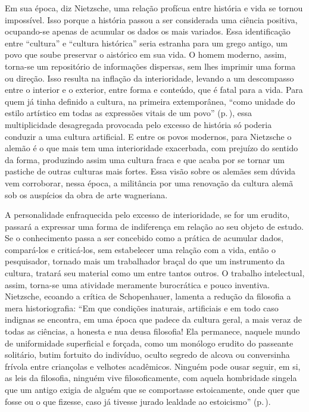 Em sua época, diz Nietzsche, uma relação profícua entre história e vida
se tornou impossível. Isso porque a história passou a ser considerada
uma ciência positiva, ocupando-se apenas de acumular os dados os mais
variados. Essa identificação entre ``cultura'' e ``cultura histórica''
seria estranha para um grego antigo, um povo que soube preservar o
aistórico em sua vida. O homem moderno, assim, torna-se um repositório
de informações dispersas, sem lhes imprimir uma forma ou direção. Isso resulta na inflação da interioridade,
levando a um descompasso entre o interior e o exterior, entre forma e
conteúdo, que é fatal para a vida. Para quem já tinha definido a
cultura, na primeira extemporânea, ``como unidade do estilo artístico em
todas as expressões vitais de um povo'' (p.\,\pageref{vitaisdeumpovo}), essa multiplicidade
desagregada provocada pelo excesso de história só poderia conduzir a uma
cultura artificial. E entre os povos modernos, para Nietzsche o alemão é
o que mais tem uma interioridade exacerbada, com prejuízo do sentido da
forma, produzindo assim uma cultura fraca e que acaba por se tornar um
pastiche de outras culturas mais fortes. Essa visão sobre os alemães sem
dúvida vem corroborar, nessa época, a militância por uma renovação da
cultura alemã sob os auspícios da obra de arte wagneriana.

A personalidade enfraquecida pelo excesso de interioridade, se for um
erudito, passará a expressar uma forma de indiferença em relação ao seu
objeto de estudo. Se o conhecimento passa a ser concebido como a prática
de acumular dados, compará-los e criticá-los, sem estabelecer uma
relação com a vida, então o pesquisador, tornado mais um trabalhador
braçal do que um instrumento da cultura, tratará seu material como um
entre tantos outros. O trabalho intelectual, assim, torna-se uma
atividade meramente burocrática e pouco inventiva. Nietzsche, ecoando a
crítica de Schopenhauer, lamenta a redução da filosofia a mera historiografia: 
``Em que condições inaturais, artificiais e em todo caso
indignas se encontra, em uma época que padece da cultura geral, a mais
veraz de todas as ciências, a honesta e nua deusa filosofia! Ela
permanece, naquele mundo de uniformidade superficial e forçada, como um
monólogo erudito do passeante solitário, butim fortuito do indivíduo,
oculto segredo de alcova ou conversinha frívola entre criançolas e
velhotes acadêmicos. Ninguém pode ousar seguir, em si, as leis da
filosofia, ninguém vive filosoficamente, com aquela hombridade singela
que um antigo exigia de alguém que se comportasse estoicamente, onde
quer que fosse ou o que fizesse, caso já tivesse jurado lealdade ao
estoicismo'' (p.\,\pageref{lealdadeaoestoicismo}).

